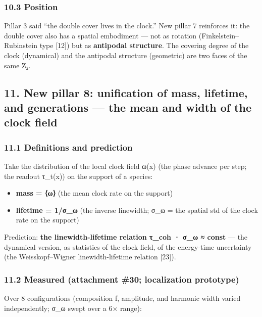 \documentclass[
]{article}
\providecommand{\tightlist}{%
  \setlength{\itemsep}{0pt}\setlength{\parskip}{0pt}}
\begin{document}
\subsubsection{10.3 Position}\label{position}

Pillar 3 said ``the double cover lives in the clock.'' New pillar 7
reinforces it: the double cover also has a spatial embodiment --- not as
rotation (Finkelstein--Rubinstein type {[}12{]}) but as
\textbf{antipodal structure}. The covering degree of the clock
(dynamical) and the antipodal structure (geometric) are two faces of the
same Z₂.

\subsection{11. New pillar 8: unification of mass, lifetime, and
generations --- the mean and width of the clock
field}\label{new-pillar-8-unification-of-mass-lifetime-and-generations-the-mean-and-width-of-the-clock-field}

\subsubsection{11.1 Definitions and
prediction}\label{definitions-and-prediction}

Take the distribution of the local clock field ω(x) (the phase advance
per step; the readout τ\_t(x)) on the support of a species:

\begin{itemize}
\tightlist
\item
  \textbf{mass = ⟨ω⟩} (the mean clock rate on the support)
\item
  \textbf{lifetime = 1/σ\_ω} (the inverse linewidth; σ\_ω = the spatial
  std of the clock rate on the support)
\end{itemize}

Prediction: \textbf{the linewidth-lifetime relation τ\_coh · σ\_ω ≈
const} --- the dynamical version, as statistics of the clock field, of
the energy-time uncertainty (the Weisskopf--Wigner linewidth-lifetime
relation {[}23{]}).

\subsubsection{11.2 Measured (attachment \#30; localization
prototype)}\label{measured-attachment-30-localization-prototype}

Over 8 configurations (composition f, amplitude, and harmonic width
varied independently; σ\_ω swept over a 6× range):
\end{document}
